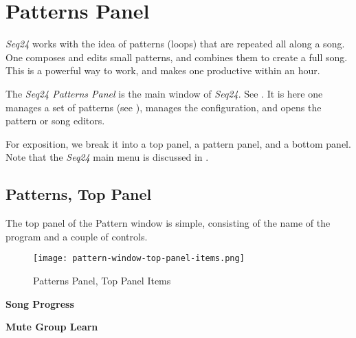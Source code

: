 %
%
%

\section{Patterns Panel}
\label{sec:seq24_patterns_panel}

   \textsl{Seq24} works with the idea of patterns (loops) that are repeated
   all along a song.  One composes and edits small patterns, and combines
   them to create a full song.  This is a powerful way to work, and makes
   one productive within an hour.

   The \textsl{Seq24 Patterns Panel} is the main window of \textsl{Seq24}.
   See .
   It is here one manages a set of patterns
   (see ),
   manages the configuration, and opens the pattern or song editors.

   For exposition, we break it into a top panel, a pattern panel, and a
   bottom panel.    Note that the \textsl{Seq24} main menu is discussed in
   .

\subsection{Patterns, Top Panel}
\label{subsec:seq24_patterns_panel_top}

   The top panel of the Pattern window is simple, consisting of the name of
   the program and a couple of controls.

\begin{figure}[H]
   \centering 
   \texttt{[image: pattern-window-top-panel-items.png]}
   \caption{Patterns Panel, Top Panel Items}
   \label{fig:pattern_window_top_panel_items}
\end{figure}

   \begin{enumber}
      \item \textbf{Song Progress}
      \item \textbf{Mute Group Learn}
   \end{enumber}

